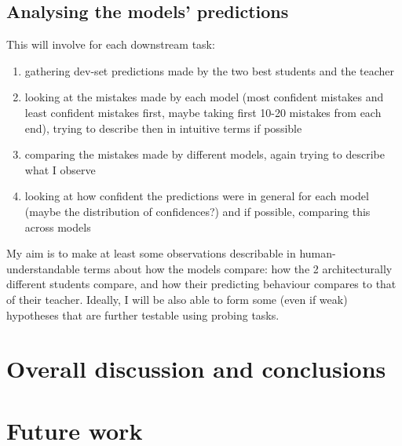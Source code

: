 \documentclass[bsc,frontabs,twoside,singlespacing,parskip,deptreport]{infthesis}
\begin{document}
{  \section{Analysing the models' predictions}{
    This will involve for each downstream task:
    \begin{enumerate}
      \item gathering dev-set predictions made by the two best students and the teacher
      \item looking at the mistakes made by each model (most confident mistakes and least confident mistakes first, maybe taking first 10-20 mistakes from each end), trying to describe then in intuitive terms if possible
      \item comparing the mistakes made by different models, again trying to describe what I observe
      \item looking at how confident the predictions were in general for each model (maybe the distribution of confidences?) and if possible, comparing this across models
    \end{enumerate}

    My aim is to make at least some observations describable in human-understandable terms about how the models compare: how the 2 architecturally different students compare, and how their predicting behaviour compares to that of their teacher.
    Ideally, I will be also able to form some (even if weak) hypotheses that are further testable using probing tasks.
  }
}

\chapter{Overall discussion and conclusions}{
  
}

\chapter{Future work}{
  
}




\appendix
\end{document}
